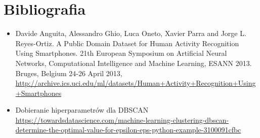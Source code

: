 \documentclass[14pt]{article}
\begin{document}
\section*{Bibliografia}
\begin{itemize}
    \item Davide Anguita, Alessandro Ghio, Luca Oneto, Xavier Parra and Jorge L. Reyes-Ortiz. A Public Domain Dataset for Human Activity Recognition Using Smartphones. 21th European Symposium on Artificial Neural Networks, Computational Intelligence and Machine Learning, ESANN 2013. Bruges, Belgium 24-26 April 2013, \newline \href{http://archive.ics.uci.edu/ml/datasets/Human+Activity+Recognition+Using+Smartphones}{http://archive.ics.uci.edu/ml/datasets/Human+Activity+Recognition+Using+Smartphones}
    
    \item Dobieranie hiperparametrów dla DBSCAN \newline \href{https://towardsdatascience.com/machine-learning-clustering-dbscan-determine-the-optimal-value-for-epsilon-eps-python-example-3100091cfbc}{https://towardsdatascience.com/machine-learning-clustering-dbscan-determine-the-optimal-value-for-epsilon-eps-python-example-3100091cfbc} 
    \end{itemize}
\end{document}
